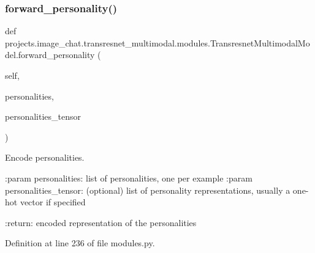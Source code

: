 \subsubsection{\texorpdfstring{forward\+\_\+personality()}{forward\_personality()}}
{\footnotesize\ttfamily def projects.\+image\+\_\+chat.\+transresnet\+\_\+multimodal.\+modules.\+Transresnet\+Multimodal\+Model.\+forward\+\_\+personality (\begin{DoxyParamCaption}\item[{}]{self,  }\item[{}]{personalities,  }\item[{}]{personalities\+\_\+tensor }\end{DoxyParamCaption})}

\begin{DoxyVerb}Encode personalities.

:param personalities:
    list of personalities, one per example
:param personalities_tensor:
    (optional) list of personality representations, usually a one-hot
    vector if specified

:return:
    encoded representation of the personalities
\end{DoxyVerb}
 

Definition at line 236 of file modules.\+py.


